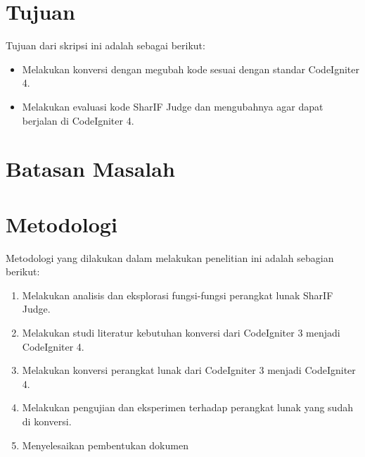 \section{Tujuan}
\label{sec:tujuan}
Tujuan dari skripsi ini adalah sebagai berikut:
\begin{itemize}
	\item Melakukan konversi dengan megubah kode sesuai dengan standar CodeIgniter 4.
	\item Melakukan evaluasi kode SharIF Judge dan mengubahnya agar dapat berjalan di CodeIgniter 4.
\end{itemize}

\section{Batasan Masalah}
\label{sec:batasan}



\section{Metodologi}
\label{sec:metlit}
Metodologi yang dilakukan dalam melakukan penelitian ini adalah sebagian berikut:
\begin{enumerate}
	\item Melakukan analisis dan eksplorasi fungsi-fungsi perangkat lunak SharIF Judge.
	\item Melakukan studi literatur kebutuhan konversi dari CodeIgniter 3 menjadi CodeIgniter 4.
	\item Melakukan konversi perangkat lunak dari CodeIgniter 3 menjadi CodeIgniter 4.
	\item Melakukan pengujian dan eksperimen terhadap perangkat lunak yang sudah di konversi.
	\item Menyelesaikan pembentukan dokumen
\end{enumerate}

